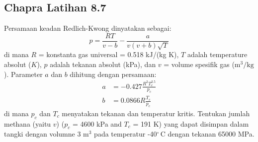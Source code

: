 \subsection{Chapra Latihan 8.7}
Persamaan keadan Redlich-Kwong dinyatakan sebagai:
\begin{equation*}
p = \frac{RT}{v - b} - \frac{a}{v(v + b)\sqrt{T}}
\end{equation*}
di mana $R$ = konstanta gas universal = 0.518 kJ/(kg K),
$T$ adalah temperature absolut ($K$), $p$ adalah tekanan absolut (kPa),
dan $v$ = volume spesifik gas ($\mathrm{m}^3/\mathrm{kg}$).
Parameter $a$ dan $b$ dihitung dengan persamaan:
\begin{align*}
a & = -0.427 \frac{R^{2} T_{c}^{2.5}}{p_{c}} \\
b & = 0.0866 R\frac{T_c}{p_c}
\end{align*}
di mana $p_c$ dan $T_c$ menyatakan tekanan dan temperatur kritis.
Tentukan jumlah methana (yaitu $v$) ($p_c$ = 4600 kPa and $T_c$ = 191 K)
yang dapat disimpan dalam tangki dengan volumne 3 $\mathrm{m}^{3}$
pada temperatur -40$^{\circ}\,\mathrm{C}$ dengan tekanan 65000 MPa.

